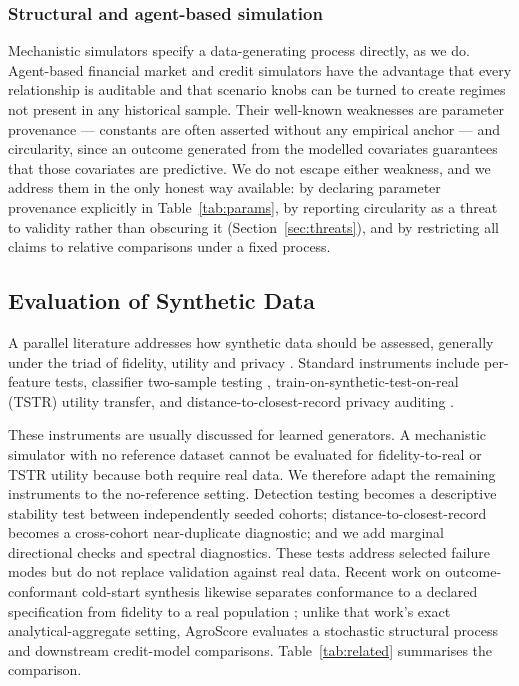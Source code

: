 \documentclass[journal]{IEEEtran}
\begin{document}
\subsubsection{Structural and agent-based simulation}
Mechanistic simulators specify a data-generating process directly, as we do. Agent-based financial market and credit simulators \cite{geanakoplos2012abm} have the advantage that every relationship is auditable and that scenario knobs can be turned to create regimes not present in any historical sample. Their well-known weaknesses are parameter provenance --- constants are often asserted without any empirical anchor --- and circularity, since an outcome generated from the modelled covariates guarantees that those covariates are predictive. We do not escape either weakness, and we address them in the only honest way available: by declaring parameter provenance explicitly in Table~\ref{tab:params}, by reporting circularity as a threat to validity rather than obscuring it (Section~\ref{sec:threats}), and by restricting all claims to relative comparisons under a fixed process.

\subsection{Evaluation of Synthetic Data}
A parallel literature addresses how synthetic data should be assessed, generally under the triad of fidelity, utility and privacy \cite{alaa2022faithful,jordon2022synthetic}. Standard instruments include per-feature tests, classifier two-sample testing \cite{lopezpaz2017c2st}, train-on-synthetic-test-on-real (TSTR) utility transfer, and distance-to-closest-record privacy auditing \cite{stadler2022synthetic}.

These instruments are usually discussed for learned generators. A mechanistic simulator with no reference dataset cannot be evaluated for fidelity-to-real or TSTR utility because both require real data. We therefore adapt the remaining instruments to the no-reference setting. Detection testing becomes a descriptive stability test between independently seeded cohorts; distance-to-closest-record becomes a cross-cohort near-duplicate diagnostic; and we add marginal directional checks and spectral diagnostics. These tests address selected failure modes but do not replace validation against real data. Recent work on outcome-conformant cold-start synthesis likewise separates conformance to a declared specification from fidelity to a real population \cite{rasin2026conformance}; unlike that work's exact analytical-aggregate setting, AgroScore evaluates a stochastic structural process and downstream credit-model comparisons. Table~\ref{tab:related} summarises the comparison.
\end{document}

